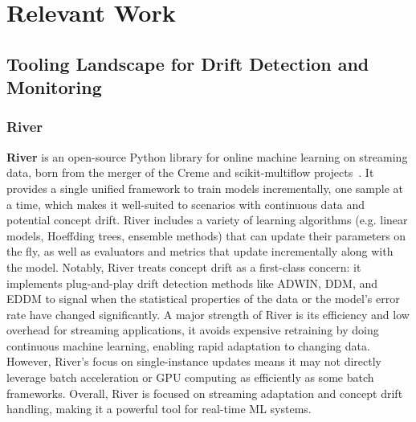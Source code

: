 \chapter{Relevant Work}
\label{ch:relevant_work}

\section{Tooling Landscape for Drift Detection and Monitoring}
\subsection{River}
\textbf{River} is an open-source Python library for online machine learning on streaming data, born from the merger of the Creme and scikit-multiflow projects~\cite{river2021jmlr}.
It provides a single unified framework to train models incrementally, one sample at a time, which makes it well-suited to scenarios with continuous data and potential concept drift.
River includes a variety of learning algorithms (e.g. linear models, Hoeffding trees, ensemble methods) that can update their parameters on the fly, as well as evaluators and metrics that update incrementally along with the model.
Notably, River treats concept drift as a first-class concern: it implements plug-and-play drift detection methods like ADWIN, DDM, and EDDM to signal when the statistical properties of the data or the model's error rate have changed significantly.
A major strength of River is its efficiency and low overhead for streaming applications, it avoids expensive retraining by doing continuous machine learning, enabling rapid adaptation to changing data.
However, River's focus on single-instance updates means it may not directly leverage batch acceleration or GPU computing as efficiently as some batch frameworks.
Overall, River is focused on streaming adaptation and concept drift handling, making it a powerful tool for real-time ML systems.

